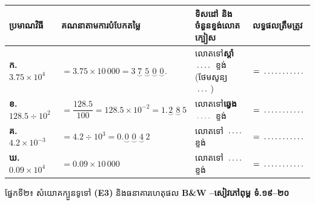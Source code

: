 \documentclass[a4paper,10pt]{article}
\newcommand{\enbf}[1]{{\TimesEn\bfseries #1}}
\newcommand{\cnum}[1]{\mbox{\fontsize{10pt}{12pt}\selectfont\ding{\numexpr181+#1\relax}}}
\newcommand{\blank}[1][1.5cm]{\makebox[#1]{\dotfill}}
\newcommand{\secbar}[2]{%
  \begin{tcolorbox}[enhanced, sharp corners, colback=headgray, colframe=black, boxrule=0.9pt, boxsep=1pt, top=2pt, bottom=2pt, left=5pt, right=5pt, before skip=4pt, after skip=3pt]
    {\muol\fontsize{9.2pt}{13pt}\selectfont #1}\hfill{\fontsize{8pt}{11pt}\selectfont\textbf{#2}}
  \end{tcolorbox}%
}
\begin{document}
{\renewcommand{\arraystretch}{1.42}
\begin{tabular}{|L{3.55cm}|L{6.25cm}|L{4.75cm}|C{3.25cm}|}
  \hline
  \textbf{ប្រមាណវិធី} & \textbf{គណនាតាមការបំបែកតម្លៃ} & \textbf{ទិសដៅ និងចំនួនខ្ទង់លោតក្បៀស} & \textbf{លទ្ធផលត្រឹមត្រូវ} \\
  \hline
  \textbf{ក.} $3.75 \times 10^4$ & $= 3.75 \times 10\,000 = 3\,\underset{\smile}{7}\,\underset{\smile}{5}\,\underset{\smile}{0}\,\underset{\smile}{0}.$ & លោតទៅ\textbf{ស្ដាំ} $\blank[0.7cm]$ ខ្ទង់ (ថែមសូន្យ $\blank[0.6cm]$) & $= \blank[1.8cm]$ \\
  \hline
  \textbf{ខ.} $128.5 \div 10^2$ & $= \dfrac{128.5}{100} = 128.5 \times 10^{-2} = 1.\underset{\smile}{2}\,\underset{\smile}{8}\,5$ & លោតទៅ\textbf{ឆ្វេង} $\blank[0.7cm]$ ខ្ទង់ & $= \blank[1.8cm]$ \\
  \hline
  \textbf{គ.} $4.2 \times 10^{-3}$ & $= 4.2 \div 10^3 = 0.\underset{\smile}{0}\,\underset{\smile}{0}\,\underset{\smile}{4}\,2$ & លោតទៅ\blank[1.2cm] $\blank[0.7cm]$ ខ្ទង់ & $= \blank[1.8cm]$ \\
  \hline
  \textbf{ឃ.} $0.09 \times 10^4$ & $= 0.09 \times 10\,000$ & លោតទៅ\blank[1.2cm] $\blank[0.7cm]$ ខ្ទង់ & $= \blank[1.8cm]$ \\
  \hline
\end{tabular}}

\secbar{ផ្នែកទី២៖ សំយោគក្បួនទូទៅ \enbf{(E3)} និងធនាគារហេតុផល \enbf{B\&W} \cnum{1}\enbf{--}\cnum{5}}{សៀវភៅពុម្ព ទំ.១៩–២០}
\end{document}
